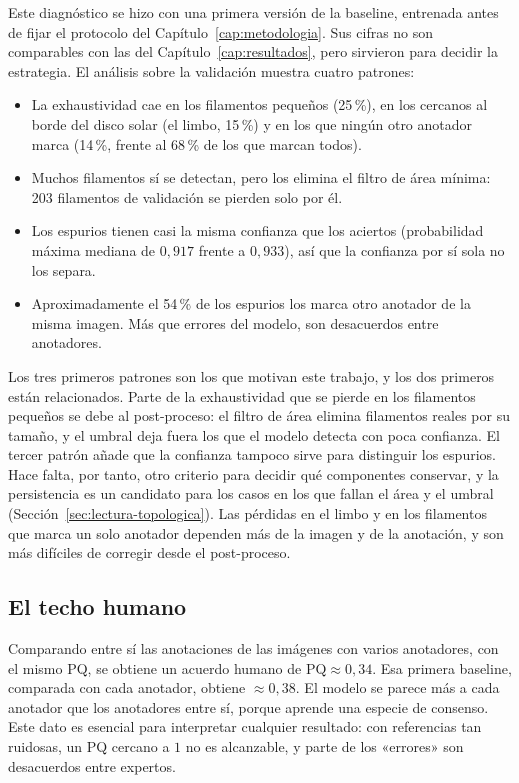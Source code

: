 Este diagnóstico se hizo con una primera versión de la baseline,
entrenada antes de fijar el protocolo del
Capítulo~\ref{cap:metodologia}. Sus cifras no son comparables con las
del Capítulo~\ref{cap:resultados}, pero sirvieron para decidir la
estrategia. El análisis sobre la validación muestra cuatro patrones:
\begin{itemize}
  \item La exhaustividad cae en los filamentos pequeños (25\,\%), en los
  cercanos al borde del disco solar (el limbo, 15\,\%) y en los que ningún otro anotador marca
  (14\,\%, frente al 68\,\% de los que marcan todos).
  \item Muchos filamentos sí se detectan, pero los elimina el filtro de
  área mínima: 203 filamentos de validación se pierden solo por él.
  \item Los espurios tienen casi la misma confianza que los aciertos
  (probabilidad máxima mediana de $0{,}917$ frente a $0{,}933$), así que
  la confianza por sí sola no los separa.
  \item Aproximadamente el 54\,\% de los espurios los marca otro
  anotador de la misma imagen. Más que errores del modelo, son
  desacuerdos entre anotadores.
\end{itemize}
Los tres primeros patrones son los que motivan este trabajo, y los dos
primeros están relacionados. Parte de la exhaustividad que se pierde en
los filamentos pequeños se debe al post-proceso: el filtro de área
elimina filamentos reales por su tamaño, y el umbral deja fuera los que
el modelo detecta con poca confianza. El tercer patrón añade que la
confianza tampoco sirve para distinguir los espurios. Hace falta, por
tanto, otro criterio para decidir qué componentes conservar, y la
persistencia es un candidato para los casos en los que fallan el área y
el umbral (Sección~\ref{sec:lectura-topologica}). Las pérdidas en el
limbo y en los filamentos que marca un solo anotador dependen más de la
imagen y de la anotación, y son más difíciles de corregir desde el
post-proceso.

\subsection{El techo humano}
\label{sec:techo-humano}

Comparando entre sí las anotaciones de las imágenes con varios
anotadores, con el mismo PQ, se obtiene un acuerdo humano de
$\mathrm{PQ}\approx0{,}34$. Esa primera baseline, comparada con cada
anotador, obtiene $\approx0{,}38$. El modelo se parece más a cada
anotador que los anotadores entre sí, porque aprende una especie de
consenso. Este dato es esencial para interpretar cualquier resultado: con
referencias tan ruidosas, un PQ cercano a $1$ no es alcanzable, y parte
de los «errores» son desacuerdos entre expertos.

